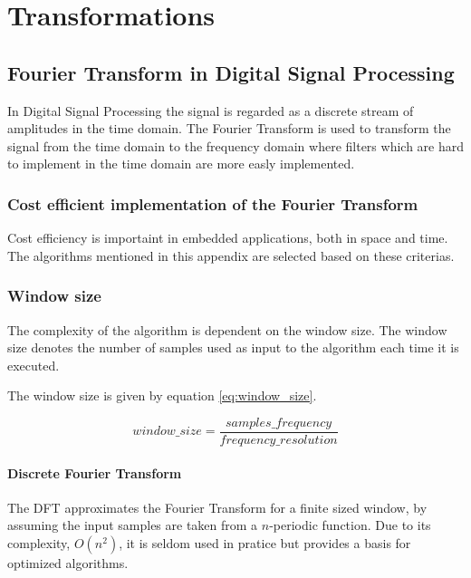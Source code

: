 \chapter{Transformations}
\section{Fourier Transform in Digital Signal Processing}

In Digital Signal Processing the signal is regarded as a discrete stream of amplitudes in the
time domain. The Fourier Transform is used to transform the signal from the time domain 
to the frequency domain where filters which are hard to implement in the time domain are
more easly implemented.


\subsection{Cost efficient implementation of the Fourier Transform}

Cost efficiency is importaint in embedded applications, both in space and time. 
The algorithms mentioned in this appendix are selected based on these criterias.

\subsection{Window size}

The complexity of the algorithm is dependent on the window size. The window size
denotes the number of samples used as input to the algorithm each time it is executed.


The window size is given by equation \ref{eq:window_size}.


\begin{equation} \label{eq:window_size}
window\_size = \frac{samples\_frequency}{frequency\_resolution}	
\end{equation}



\subsubsection{Discrete Fourier Transform}

The DFT approximates the Fourier Transform for a finite sized window, by assuming the 
input samples are taken from a $n$-periodic function. Due to its complexity, $O(n^2)$, 
it is seldom used in pratice but provides a basis for optimized algorithms. 

